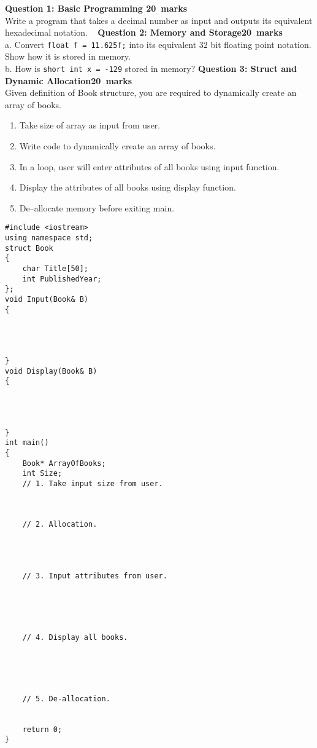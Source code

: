 \documentclass[12pt,a4paper]{article}
\def\Qone{20}
\def\Qtwo{20}
\def\Qthree{20}
\begin{document}
\newpage
\pagestyle{fancy}
\noindent\textbf{Question 1: Basic Programming \hfill \Qone~marks}\\
Write a program that takes a decimal number as input and outputs its equivalent hexadecimal notation.
\newpage~
\newpage
\noindent \textbf{Question 2: Memory and Storage\hfill \Qtwo~marks}\\
a. Convert \verb|float f = 11.625f;| into its equivalent 32 bit floating point notation. Show how it is stored in memory.\\[12.5cm]
b. How is \verb|short int x = -129| stored in memory?
\newpage
\noindent\textbf{Question 3: Struct and Dynamic Allocation\hfill \Qthree~marks}\\
Given definition of Book structure, you are required to dynamically create an array of books.
\begin{enumerate}
\item Take size of array as input from user.
\item Write code to dynamically create an array of books.
\item In a loop, user will enter attributes of all books using input function.
\item Display the attributes of all books using display function.
\item De--allocate memory before exiting main.
\end{enumerate}
\begin{lstlisting}
#include <iostream>
using namespace std;
struct Book
{
	char Title[50];
	int PublishedYear;
};
void Input(Book& B)
{




}
void Display(Book& B)
{




}
int main()
{
	Book* ArrayOfBooks;
	int Size;
	// 1. Take input size from user.
		
		
	
	// 2. Allocation.
		
	
	
	
	// 3. Input attributes from user.
		
	
	
	
	
	// 4. Display all books.
		
	
		
		
		
	// 5. De-allocation.
		
	
	return 0;
}
\end{lstlisting}
\end{document}
